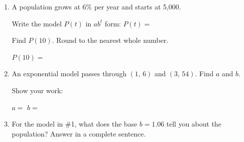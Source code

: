 \documentclass[10pt]{article}
\begin{document}
\namedateperiod

\vspace{0.14in}

\begin{enumerate}[itemsep=16pt]

\item A population grows at 6\% per year and starts at 5{,}000.

      Write the model $P(t)$ in $ab^t$ form: \quad $P(t) = $ \blank{6cm}

      \vspace{0.06in}
      Find $P(10)$. Round to the nearest whole number.

      \vspace{0.06in}
      $P(10) = $ \blank{7cm}

\item An exponential model passes through $(1,\,6)$ and $(3,\,54)$. Find $a$ and $b$.

      \vspace{0.06in}
      Show your work:

      \vspace{0.5in}

      $a = $ \blank{3cm} \quad $b = $ \blank{3cm}

\item For the model in \#1, what does the base $b = 1.06$ tell you about the population?
      Answer in a complete sentence.

      \vspace{0.06in}

\end{enumerate}
\end{document}
